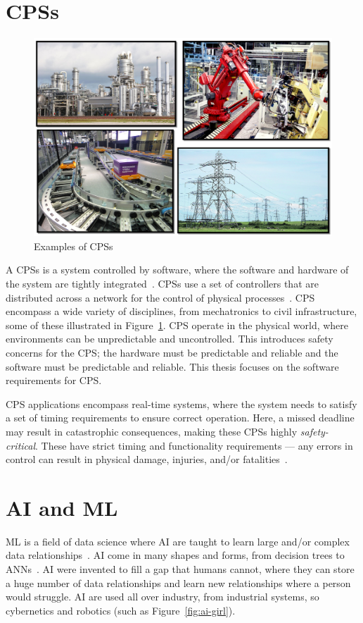 \section{\acfp{CPS}}
\begin{figure}[t]
	\centering
	\includegraphics[width=\textwidth]{Content/fig/1234.png}
	\caption{Examples of \acp{CPS} \label{fig:cps}}
\end{figure}

A \acfp{CPS} is a system controlled by software, where the software and hardware of the system are tightly integrated~\cite{cps-design}.
\acp{CPS} use a set of controllers that are distributed across a network for the control of physical processes~\cite{alur2015principles}. 
\ac{CPS} encompass a wide variety of disciplines, from mechatronics to civil infrastructure, some of these illustrated in Figure~\ref{fig:cps}.
\ac{CPS} operate in the physical world, where environments can be unpredictable and uncontrolled.
This introduces safety concerns for the \ac{CPS}; the hardware must be predictable and reliable and the software must be predictable and reliable.
This thesis focuses on the software requirements for \ac{CPS}.

\ac{CPS} applications encompass real-time systems, where the system needs to satisfy a set of timing requirements to ensure correct operation. 
Here, a missed deadline may result in catastrophic consequences, making these \acp{CPS} highly \textit{safety-critical}. 
These have strict timing and functionality requirements --- any errors in control can result in physical damage, injuries, and/or fatalities~\cite{ANNDevModel1999}. 


\section{\acf{AI} and \acf{ML}}
\acf{ML} is a field of data science where \acf{AI} are taught to learn large and/or complex data relationships~\cite{ai}.
\ac{AI} come in many shapes and forms, from decision trees to \acfp{ANN}~\cite{ai-types}.
\ac{AI} were invented to fill a gap that humans cannot, where they can store a huge number of data relationships and learn new relationships where a person would struggle.
\ac{AI} are used all over industry, from industrial systems, so cybernetics and robotics (such as Figure~\ref{fig:ai-girl}).


